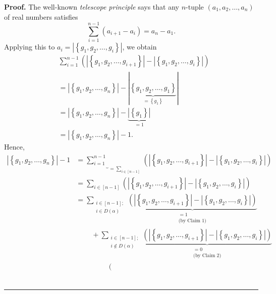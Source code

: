 \documentclass[numbers=enddot,12pt,final,onecolumn,notitlepage]{scrartcl}%
\theoremstyle{definition}
\newenvironment{proof}[1][Proof]{\noindent\textbf{#1.} }{\ \rule{0.5em}{0.5em}}
\let\sumnonlimits\sum
\renewcommand{\sum}{\sumnonlimits\limits}
\newenvironment{verlong}{}{}
\begin{document}
\begin{verlong}
\begin{proof}
The well-known \emph{telescope principle} says that any $n$-tuple $\left(
a_{1},a_{2},\ldots,a_{n}\right)  $ of real numbers satisfies%
\[
\sum_{i=1}^{n-1}\left(  a_{i+1}-a_{i}\right)  =a_{n}-a_{1}.
\]
Applying this to $a_{i}=\left\vert \left\{  g_{1},g_{2},\ldots,g_{i}\right\}
\right\vert $, we obtain
\begin{align*}
&  \sum_{i=1}^{n-1}\left(  \left\vert \left\{  g_{1},g_{2},\ldots
,g_{i+1}\right\}  \right\vert -\left\vert \left\{  g_{1},g_{2},\ldots
,g_{i}\right\}  \right\vert \right) \\
&  =\left\vert \left\{  g_{1},g_{2},\ldots,g_{n}\right\}  \right\vert
-\left\vert \underbrace{\left\{  g_{1},g_{2},\ldots,g_{1}\right\}
}_{=\left\{  g_{1}\right\}  }\right\vert \\
&  =\left\vert \left\{  g_{1},g_{2},\ldots,g_{n}\right\}  \right\vert
-\underbrace{\left\vert \left\{  g_{1}\right\}  \right\vert }_{=1}\\
&  =\left\vert \left\{  g_{1},g_{2},\ldots,g_{n}\right\}  \right\vert -1.
\end{align*}
Hence,%
\begin{align*}
\left\vert \left\{  g_{1},g_{2},\ldots,g_{n}\right\}  \right\vert -1  &
=\underbrace{\sum_{i=1}^{n-1}}_{=\sum_{i\in\left[  n-1\right]  }}\left(
\left\vert \left\{  g_{1},g_{2},\ldots,g_{i+1}\right\}  \right\vert
-\left\vert \left\{  g_{1},g_{2},\ldots,g_{i}\right\}  \right\vert \right) \\
&  =\sum_{i\in\left[  n-1\right]  }\left(  \left\vert \left\{  g_{1}%
,g_{2},\ldots,g_{i+1}\right\}  \right\vert -\left\vert \left\{  g_{1}%
,g_{2},\ldots,g_{i}\right\}  \right\vert \right) \\
&  =\sum_{\substack{i\in\left[  n-1\right]  ;\\i\in D\left(  \alpha\right)
}}\underbrace{\left(  \left\vert \left\{  g_{1},g_{2},\ldots,g_{i+1}\right\}
\right\vert -\left\vert \left\{  g_{1},g_{2},\ldots,g_{i}\right\}  \right\vert
\right)  }_{\substack{=1\\\text{(by Claim 1)}}}\\
&  \ \ \ \ \ \ \ \ \ \ +\sum_{\substack{i\in\left[  n-1\right]  ;\\i\notin
D\left(  \alpha\right)  }}\underbrace{\left(  \left\vert \left\{  g_{1}%
,g_{2},\ldots,g_{i+1}\right\}  \right\vert -\left\vert \left\{  g_{1}%
,g_{2},\ldots,g_{i}\right\}  \right\vert \right)  }_{\substack{=0\\\text{(by
Claim 2)}}}\\
&  \ \ \ \ \ \ \ \ \ \ \ \ \ \ \ \ \ \ \ \ \left(

\end{align*}
\end{proof}
\end{verlong}
\end{document}
